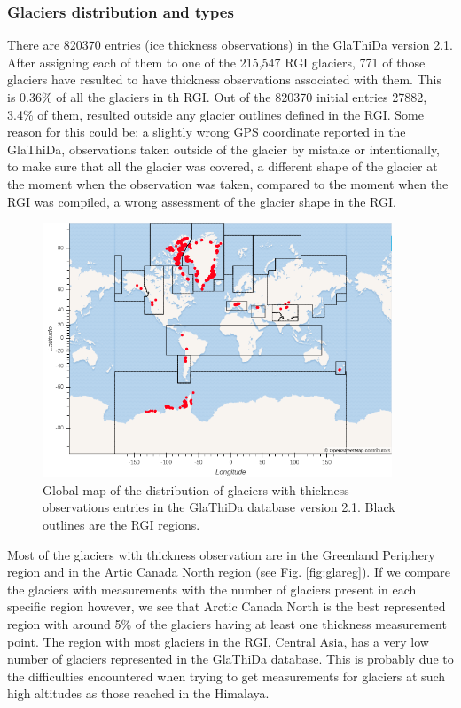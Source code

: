 \subsubsection{Glaciers distribution and types}
There are 820370 entries (ice thickness observations) in the GlaThiDa version 2.1. After assigning each of them to one of the 215,547 RGI glaciers, 771 of those glaciers have resulted to have thickness observations associated with them. This is 0.36\% of all the glaciers in th RGI. Out of the 820370 initial entries 27882, 3.4\% of them, resulted outside any glacier outlines defined in the RGI. Some reason for this could be: a slightly wrong GPS coordinate reported in the GlaThiDa, observations taken outside of the glacier by mistake or intentionally, to make sure that all the glacier was covered, a different shape of the glacier at the moment when the observation was taken, compared to the moment when the RGI was compiled, a wrong assessment of the glacier shape in the RGI.
\begin{figure}[tp]\label{glathidamap} 
	\centering 
	\includegraphics[width=0.93\textwidth]{./figures/GlaThiDa_map.png}
	\caption{Global map of the distribution of glaciers with thickness observations entries in the GlaThiDa database version 2.1. Black outlines are the RGI regions.}
\end{figure}

Most of the glaciers with thickness observation are in the Greenland Periphery region and in the Artic Canada North region (see Fig. \ref{fig:glareg}). If we compare the glaciers with measurements with the number of glaciers present in each specific region however, we see that Arctic Canada North is the best represented region with around 5\% of the glaciers having at least one thickness measurement point. The region with most glaciers in the RGI, Central Asia, has a very low number of glaciers represented in the GlaThiDa database. This is probably due to the difficulties encountered when trying to get measurements for glaciers at such high altitudes as those reached in the Himalaya.


